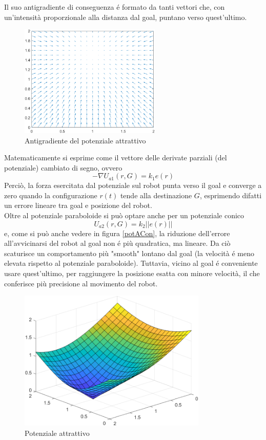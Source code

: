 \documentclass[14pt,a4paper]{extarticle}
\begin{document}
\begin{description}
Il suo antigradiente di conseguenza é formato da tanti vettori che, con un'intensità proporzionale alla distanza dal goal, puntano verso quest'ultimo.
\begin{figure}[H]
\centering
\caption{Antigradiente del potenziale attrattivo}
\label{antigradA}
\includegraphics[width=0.6\textwidth]{antigradA.png}
\end{figure} 
Matematicamente si esprime come il vettore delle derivate parziali (del potenziale) cambiato di segno, ovvero 
\begin{equation}
-\nabla U_{a1}(r,G) = k_1 e(r)
\end{equation}
Perciò, la forza esercitata dal potenziale sul robot punta verso il goal e converge a zero quando la configurazione \(r(t)\) tende alla destinazione \(G\), esprimendo difatti un errore lineare tra goal e posizione del robot.\\
Oltre al potenziale paraboloide si può optare anche per un potenziale conico 
\begin{equation}
U_{a2}(r,G) = k_2||e(r)||
\end{equation}
e, come si può anche vedere in figura \ref{potACon}, la riduzione dell'errore all'avvicinarsi del robot al goal non é più quadratica, ma lineare. Da ciò scaturisce un comportamento più "smooth" lontano dal goal (la velocità é meno elevata rispetto al potenziale paraboloide). Tuttavia, vicino al goal é conveniente usare quest'ultimo, per raggiungere la posizione esatta con minore velocità, il che conferisce più precisione al movimento del robot. 
\begin{figure}[H]
\centering
\caption{Potenziale attrattivo}
\includegraphics[width=0.8\textwidth]{potACon.png}

\end{figure}
\end{description}
\end{document}
